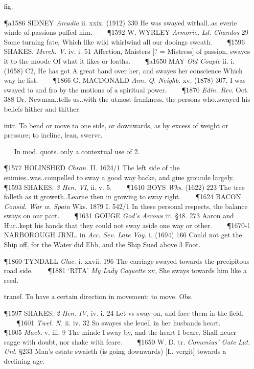 \begin{description}[wide, labelwidth=!, labelindent=0pt]
\begin{myenumerate}
 fig.

\P a1586 SIDNEY  \textit{Arcadia} ii. xxix. (1912) 330 He was swayed withall..as everie winde of passions puffed him.    
\P 1592 W. WYRLEY  \textit{Armorie, Ld. Chandos} 29 Some turning fate, Which like wild whirlwind all our dooings sweath.    
\P 1596 SHAKES.  \textit{Merch. V.} iv. i. 51 Affection, Maisters [? = Mistress] of passion, swayes it to the moode Of what it likes or loaths.    
\P a1650 MAY  \textit{Old Couple} ii. i. (1658) C2, He has got A great hand over her, and swayes her conscience Which way he list.    
\P 1866 G. MACDONALD  \textit{Ann. Q. Neighb.} xv. (1878) 307, I was swayed to and fro by the motions of a spiritual power.    
\P 1870  \textit{Edin. Rev.} Oct. 388 Dr. Newman..tells us..with the utmost frankness, the persons who..swayed his beliefs hither and thither.

 intr. To bend or move to one side, or downwards, as by excess of weight or pressure; to incline, lean, swerve.

   In mod. quots. only a contextual use of 2.

\P 1577 HOLINSHED  \textit{Chron.} II. 1624/1 The left side of the enimies..was..compelled to sway a good way backe, and giue grounde largely.    
\P 1593 SHAKES.  \textit{3 Hen. VI}, ii. v. 5.    
\P 1610 BOYS  \textit{Wks.} (1622) 223 The tree falleth as it groweth..Learne then in growing to sway right.    
\P 1624 BACON  \textit{Consid. War w. Spain} Wks. 1879 I. 542/1  In these personal respects, the balance sways on our part.    
\P 1631 GOUGE  \textit{God's Arrows} iii. §48. 273 Aaron and Hur..kept his hands that they could not sway aside one way or other.    
\P 1670-1 NARBOROUGH JRNL. in  \textit{Acc. Sev. Late Voy.} i. (1694) 166 Could not get the Ship off, for the Water did Ebb, and the Ship Sued above 3 Foot.

\P 1860 TYNDALL  \textit{Glac.} i. xxvii. 196 The carriage swayed towards the precipitous road side.    
\P 1881 ‘RITA’  \textit{My Lady Coquette} xv, She sways towards him like a reed.

 transf. To have a certain direction in movement; to move. Obs.

\P 1597 SHAKES.  \textit{2 Hen. IV,} iv. i. 24 Let vs sway-on, and face them in the field.    
\P 1601  \textit{ Twel. N.} ii. iv. 32 So swayes she leuell in her husbands heart.    
\P 1605  \textit{ Macb.} v. iii. 9 The minde I sway by, and the heart I beare, Shall neuer sagge with doubt, nor shake with feare.    
\P 1650 W. D. tr.  \textit{Comenius' Gate Lat. Unl.} §233 Man's estate swaieth (is going downwards) [L. vergit] towards a declining age.


\end{myenumerate}
\end{description}
